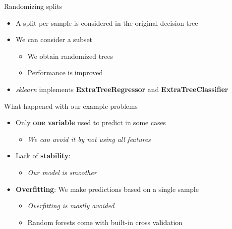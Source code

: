 \begin{frame}{Randomizing splits}
    \begin{itemize}
        \item A split per sample is considered in the original decision tree
        \item We can consider a subset
        \begin{itemize}
            \item We obtain randomized trees
            \item Performance is improved
        \end{itemize}
        \item \emph{sklearn} implements \textbf{ExtraTreeRegressor} and \textbf{ExtraTreeClassifier}
    \end{itemize}

\end{frame}


\begin{frame}[fragile]{What happened with our example problems}
    \begin{itemize}
        \item Only \textbf{one variable} used to predict in some cases
        \begin{itemize}
            \item \emph{We can avoid it by not using all features}
        \end{itemize}
        \item Lack of \textbf{stability}:
        \begin{itemize}
            \item \emph{Our model is smoother}
        \end{itemize}
        \item \textbf{Overfitting}: We make predictions based on a single sample
        \begin{itemize}
            \item \emph{Overfitting is mostly avoided}
            \item Random forests come with built-in cross validation
        \end{itemize}

    \end{itemize}

\end{frame}

